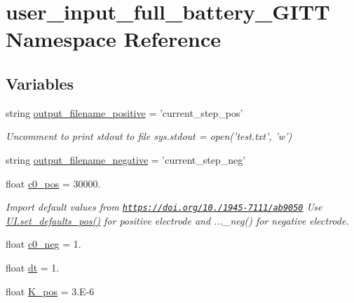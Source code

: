 \hypertarget{namespaceuser__input__full__battery___g_i_t_t}{\section{user\-\_\-input\-\_\-full\-\_\-battery\-\_\-\-G\-I\-T\-T Namespace Reference}
\label{namespaceuser__input__full__battery___g_i_t_t}
}
\subsection*{Variables}
\begin{DoxyCompactItemize}
\item 
string \hyperlink{namespaceuser__input__full__battery___g_i_t_t_aa07a082ed078c3321f15b79529277837}{output\-\_\-filename\-\_\-positive} = 'current\-\_\-step\-\_\-pos'
\begin{DoxyCompactList}\small\item\em Uncomment to print stdout to file sys.\-stdout = open('test.\-txt', 'w') \end{DoxyCompactList}\item 
string \hyperlink{namespaceuser__input__full__battery___g_i_t_t_a701d8142cb069e7737cab8445986caa3}{output\-\_\-filename\-\_\-negative} = 'current\-\_\-step\-\_\-neg'
\item 
float \hyperlink{namespaceuser__input__full__battery___g_i_t_t_a5abfcbf596ddd1acc1de08c37cfde9c3}{c0\-\_\-pos} = 30000.
\begin{DoxyCompactList}\small\item\em Import default values from \href{https://doi.org/10.1149/1945-7111/ab9050}{\tt https\-://doi.\-org/10./1945-\/7111/ab9050} Use \hyperlink{namespaceuser__input__mod_acef497295190e3914f7cd93da2708856}{U\-I.\-set\-\_\-defaults\-\_\-pos()} for positive electrode and ...\-\_\-neg() for negative electrode. \end{DoxyCompactList}\item 
float \hyperlink{namespaceuser__input__full__battery___g_i_t_t_ad1f2e3ea1e8872b82ad0a3f8b86f0769}{c0\-\_\-neg} = 1.
\item 
float \hyperlink{namespaceuser__input__full__battery___g_i_t_t_a778e38aa889751afffa2dea6b803e67a}{dt} = 1.
\item 
float \hyperlink{namespaceuser__input__full__battery___g_i_t_t_ab1a8ebec490ba1301f818bd1c5f1f3fa}{K\-\_\-pos} = 3.\-E-\/6
\item 

\end{DoxyCompactItemize}
